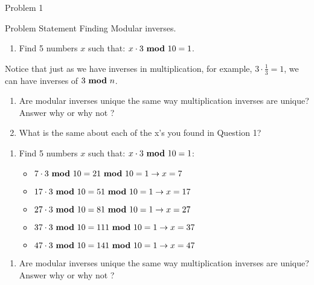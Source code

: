 \begin{problem}{Problem 1}
    \begin{statement}{Problem Statement}
        Finding Modular inverses.

        \begin{enumerate}[label = (\alph*)]
            \item Find 5 numbers $x$ such that: $x \cdot 3 \text{ \textbf{mod} } 10 = 1$.
        \end{enumerate}
        Notice that just as we have inverses in multiplication, for example, $3 \cdot \frac{1}{3} = 1$, we can have inverses of $3 \text{ \textbf{mod} } n$.

        \begin{enumerate}[label = (\alph*), start = 2]
            \item Are modular inverses unique the same way multiplication inverses are unique? Answer why or why not ?
            \item What is the same about each of the x's you found in Question 1?
        \end{enumerate}
    \end{statement}

    \begin{highlight}
        \begin{enumerate}[label = (\alph*)]
            \item Find 5 numbers $x$ such that: $x \cdot 3 \text{ \textbf{mod} } 10 = 1$:
            \begin{itemize}
                \item $7 \cdot 3 \text{ \textbf{mod} } 10 = 21 \text{ \textbf{mod} } 10 = 1 \rightarrow x = 7$
                \item $17 \cdot 3 \text{ \textbf{mod} } 10 = 51 \text{ \textbf{mod} } 10 = 1 \rightarrow x = 17$
                \item $27 \cdot 3 \text{ \textbf{mod} } 10 = 81 \text{ \textbf{mod} } 10 = 1 \rightarrow x = 27$
                \item $37 \cdot 3 \text{ \textbf{mod} } 10 = 111 \text{ \textbf{mod} } 10 = 1 \rightarrow x = 37$
                \item $47 \cdot 3 \text{ \textbf{mod} } 10 = 141 \text{ \textbf{mod} } 10 = 1 \rightarrow x = 47$
            \end{itemize}
        \end{enumerate}
    \end{highlight}

    \begin{highlight}
        \begin{enumerate}[label = (\alph*), start = 2]
            \item Are modular inverses unique the same way multiplication inverses are unique? Answer why or why not ?
        \end{enumerate}


\end{highlight}
\end{problem}
